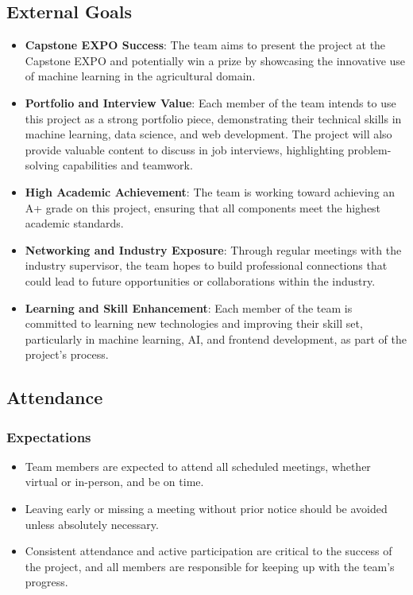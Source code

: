 \documentclass{article}
\begin{document}
\subsection*{External Goals}

\begin{itemize}
    \item \textbf{Capstone EXPO Success}: The team aims to present the project
    at the Capstone EXPO and potentially win a prize by showcasing the
    innovative use of machine learning in the agricultural domain.
    
    \item \textbf{Portfolio and Interview Value}: Each member of the team
    intends to use this project as a strong portfolio piece, demonstrating their
    technical skills in machine learning, data science, and web development. The
    project will also provide valuable content to discuss in job interviews,
    highlighting problem-solving capabilities and teamwork.
    
    \item \textbf{High Academic Achievement}: The team is working toward
    achieving an A+ grade on this project, ensuring that all components meet the
    highest academic standards.
    
    \item \textbf{Networking and Industry Exposure}: Through regular meetings
    with the industry supervisor, the team hopes to build professional
    connections that could lead to future opportunities or collaborations within
    the industry.
    
    \item \textbf{Learning and Skill Enhancement}: Each member of the team is
    committed to learning new technologies and improving their skill set,
    particularly in machine learning, AI, and frontend development, as part of
    the project's process.
\end{itemize}


\subsection*{Attendance}

\subsubsection*{Expectations}

\begin{itemize}
    \item Team members are expected to attend all scheduled meetings, whether
    virtual or in-person, and be on time.
    \item Leaving early or missing a meeting without prior notice should be
    avoided unless absolutely necessary.
    \item Consistent attendance and active participation are critical to the
    success of the project, and all members are responsible for keeping up with
    the team's progress.
\end{itemize}
\end{document}
